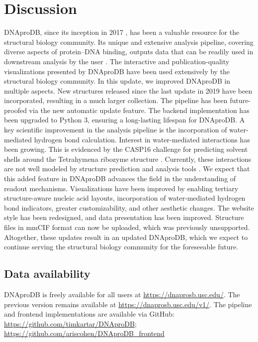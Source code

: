 \section{Discussion}
DNAproDB, since its inception in 2017 \citep{Sagendorf2017}, has been a valuable resource for the structural biology community. Its unique and extensive analysis pipeline, covering diverse aspects of protein–DNA binding, outputs data that can be readily used in downstream analysis by the user \citep{Sagendorf2020}. The interactive and publication-quality visualizations presented by DNAproDB have been used extensively by the structural biology community. In this update, we improved DNAproDB in multiple aspects. New structures released since the last update in 2019 \citep{Sagendorf2020} have been incorporated, resulting in a much larger collection. The pipeline has been future-proofed via the new automatic update feature. The backend implementation has been upgraded to Python 3, ensuring a long-lasting lifespan for DNAproDB. 
A key scientific improvement in the analysis pipeline is the incorporation of water-mediated hydrogen bond calculation. Interest in water-mediated interactions has been growing. This is evidenced by the CASP16 challenge for predicting solvent shells around the Tetrahymena ribozyme structure \citep{kryshtafovych2023critical}. Currently, these interactions are not well modeled by structure prediction and analysis tools \citep{Abramson2024, baek2024na, Krishna2024, Mitra2024, Jumper2021, Sagendorf2024}. We expect that this added feature in DNAproDB advances the field in the understanding of readout mechanisms. 
Visualizations have been improved by enabling tertiary structure-aware nucleic acid layouts, incorporation of water-mediated hydrogen bond indicators, greater customizability, and other aesthetic changes. The website style has been redesigned, and data presentation has been improved. Structure files in mmCIF format can now be uploaded, which was previously unsupported. Altogether, these updates result in an updated DNAproDB, which we expect to continue serving the structural biology community for the foreseeable future.

\subsection{Data availability}
DNAproDB is freely available for all users at \url{https://dnaprosb.usc.edu/}. The previous version remains available at \url{https://dnaprosb.usc.edu/v1/}. 
The pipeline and frontend implementations are available via GitHub:
\url{https://github.com/timkartar/DNAproDB}; 
\url{https://github.com/ariscohen/DNAproDB_frontend}
